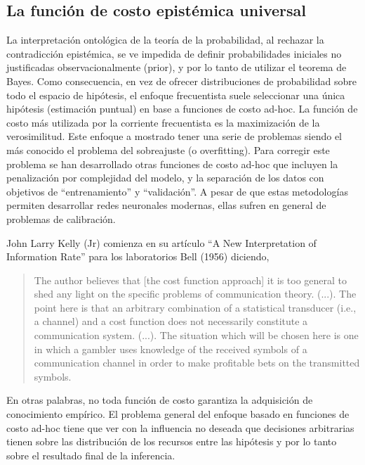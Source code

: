 \documentclass[a4paper,10pt]{book}
\theoremstyle{definition}
\begin{document}
\subsection{La funci\'on de costo epist\'emica universal}

% 

La interpretaci\'on ontol\'ogica de la teor\'ia de la probabilidad, al rechazar la contradicci\'on epist\'emica, se ve impedida de definir probabilidades iniciales no justificadas observacionalmente (prior), y por lo tanto de utilizar el teorema de Bayes.
%
Como consecuencia, en vez de ofrecer distribuciones de probabilidad sobre todo el espacio de hip\'otesis, el enfoque frecuentista suele seleccionar una única hip\'otesis (estimaci\'on puntual) en base a funciones de costo ad-hoc.
%
La funci\'on de costo m\'as utilizada por la corriente frecuentista es la maximizaci\'on de la verosimilitud.
%
Este enfoque a mostrado tener una serie de problemas siendo el m\'as conocido el problema del sobreajuste (o overfitting).
%
Para corregir este problema se han desarrollado otras funciones de costo ad-hoc que incluyen la penalizaci\'on por complejidad del modelo, y la separaci\'on de los datos con objetivos de ``entrenamiento'' y ``validaci\'on''.
%
A pesar de que estas metodolog\'ias permiten desarrollar redes neuronales modernas, ellas sufren en general de problemas de calibraci\'on. 


John Larry Kelly (Jr) comienza en su art\'iculo ``A New Interpretation of Information Rate'' para los laboratorios Bell (1956) diciendo, 
%
\begin{quotation}
The author believes that [the cost function approach] it is too general to shed any light on the specific problems of communication theory. (...). The point here is that an arbitrary combination of a statistical transducer (i.e., a channel) and a cost function does not necessarily constitute a communication system. (...). The situation which will be chosen here is one in which a gambler uses knowledge of the received symbols of a communication channel in order to make profitable bets on the transmitted symbols.
\end{quotation}
%
En otras palabras, no toda funci\'on de costo garantiza la adquisici\'on de conocimiento emp\'irico.
%
El problema general del enfoque basado en funciones de costo ad-hoc tiene que ver con la influencia no deseada que decisiones arbitrarias tienen sobre las distribuci\'on de los recursos entre las hip\'otesis y por lo tanto sobre el resultado final de la inferencia.
\end{document}
